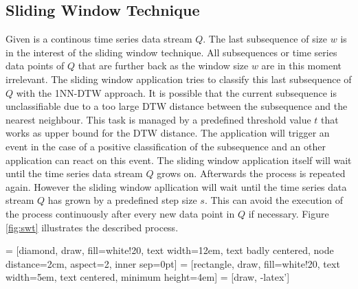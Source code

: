 \subsection{Sliding Window Technique} \label{sliding_window_technique}
Given is a continous time series data stream $Q$. The last subsequence of size $w$ is in the interest of the sliding
window technique. All subsequences or time series data points of $Q$ that are further back as the window size $w$ are in
this moment irrelevant. The sliding window application tries to classify this last subsequence of $Q$ with the 1NN-DTW
approach. It is possible that the current subsequence is unclassifiable due to a too large DTW distance between the
subsequence and the nearest neighbour. This task is managed by a predefined threshold value $t$ that works as upper
bound for the DTW distance. The application will trigger an event in the case of a positive classification of the
subsequence and an other application can react on this event. The sliding window application itself will wait until the
time series data stream $Q$ grows on. Afterwards the process is repeated again. However the sliding window apllication
will wait until the time series data stream $Q$ has grown by a predefined step size $s$. This can avoid the execution
of the process continuously after every new data point in $Q$ if necessary. Figure \ref{fig:swt} illustrates the
described process.

 = [diamond, draw, fill=white!20, text width=12em, text badly centered, node distance=2cm, aspect=2, inner sep=0pt]
 = [rectangle, draw, fill=white!20, text width=5em, text centered, minimum height=4em]
 = [draw, -latex']

